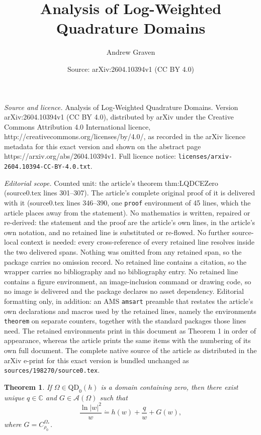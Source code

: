 \documentclass[10pt,a4paper]{amsart}
\title{Analysis of Log-Weighted Quadrature Domains}
\author{Andrew Graven}
\date{Source: arXiv:2604.10394v1 (CC BY 4.0)}
\newtheorem{theorem}{Theorem}
\newcommand{\A}{\mathcal{A}}
\newcommand{\C}{\mathbb{C}}
\newcommand{\IntComp}{_{\ast}} %
\newcommand{\QD}{\text{QD}}
\newcommand{\dEquals}{\dot{=}}
\begin{document}
\maketitle

\noindent\emph{Source and licence.} Analysis of Log-Weighted Quadrature Domains. Version arXiv:2604.10394v1 (CC BY 4.0), distributed by arXiv under the Creative Commons Attribution 4.0 International licence, http://creativecommons.org/licenses/by/4.0/, as recorded in the arXiv licence metadata for this exact version and shown on the abstract page https://arxiv.org/abs/2604.10394v1. Full licence notice: \texttt{licenses/arxiv-2604.10394-CC-BY-4.0.txt}.\par\smallskip

\noindent\textit{Editorial scope.} Counted unit: the article's theorem thm:LQDCEZero (source0.tex lines 301--307). The article's complete original proof of it is delivered with it (source0.tex lines 346--390, one \texttt{proof} environment of 45 lines, which the article places away from the statement). No mathematics is written, repaired or re-derived: the statement and the proof are the article's own lines, in the article's own notation, and no retained line is substituted or re-flowed.  No further source-local context is needed: every cross-reference of every retained line resolves inside the two delivered spans.  Nothing was omitted from any retained span, so the package carries no omission record.  No retained line contains a citation, so the wrapper carries no bibliography and no bibliography entry.  No retained line contains a figure environment, an image-inclusion command or drawing code, so no image is delivered and the package declares no asset dependency.  Editorial formatting only, in addition: an AMS \texttt{amsart} preamble that restates the article's own declarations and macros used by the retained lines, namely the environments \texttt{theorem} on separate counters, together with the standard packages those lines need.  The retained environments print in this document as Theorem 1 in order of appearance, whereas the article prints the same items with the numbering of its own full document.  The complete native source of the article as distributed in the arXiv e-print for this exact version is bundled unchanged as \texttt{sources/198270/source0.tex}.
\begin{theorem}\label{thm:LQDCEZero}
    If $\Omega\in\QD_0(h)$ is a domain containing zero, then there exist unique $q\in\C$ and $G\in\A(\Omega)$ such that
    \begin{equation}\label{eqn:LQDCEZero}
        \dfrac{\ln|w|^2}{w}\dEquals h(w)+\dfrac{q}{w}+G(w),
    \end{equation}
    where $G=C_{\rho_0}^{\Omega\IntComp}$.
\end{theorem}
\end{document}
